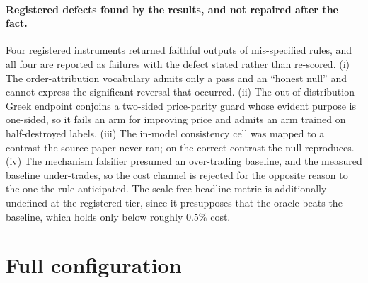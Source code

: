 \documentclass[10pt]{article}
\begin{document}
\paragraph{Registered defects found by the results, and not repaired after the fact.}
Four registered instruments returned faithful outputs of mis-specified rules, and
all four are reported as failures with the defect stated rather than re-scored.
(i) The order-attribution vocabulary admits only a pass and an ``honest null'' and
cannot express the significant reversal that occurred. (ii) The out-of-distribution
Greek endpoint conjoins a two-sided price-parity guard whose evident purpose is
one-sided, so it fails an arm for improving price and admits an arm trained on
half-destroyed labels. (iii) The in-model consistency cell was mapped to a contrast
the source paper never ran; on the correct contrast the null reproduces. (iv) The
mechanism falsifier presumed an over-trading baseline, and the measured baseline
under-trades, so the cost channel is rejected for the opposite reason to the one
the rule anticipated. The scale-free headline metric is additionally undefined at
the registered tier, since it presupposes that the oracle beats the baseline, which
holds only below roughly $0.5\%$ cost.

\section{Full configuration}
\label{app:config}
\end{document}

